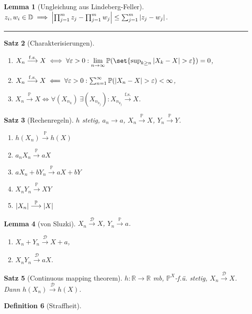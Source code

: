\documentclass[a4paper,8pt]{article}
\newcounter{Sec}
\theoremstyle{nonumberbreak}
\newtheorem{definition}{Definition}[Sec]
\newtheorem{satz}[definition]{Satz}
\newtheorem{lemma}[definition]{Lemma}
\newcommand{\sep}{%
	\rule{\linewidth}{0.15pt}%
	\stepcounter{Sec}%
	}
\renewcommand{\P}{\mathbb{P}}
\newcommand{\R}{\mathbb{R}}
\newcommand{\sk}{\mathrel{\stackrel{\P}{\longrightarrow}}}
\newcommand{\fsk}{\mathrel{\stackrel{\operatorname{f.s.}}{\longrightarrow}}}
\newcommand{\vk}{\mathrel{\stackrel{\mathcal{D}}{\longrightarrow}}}
\begin{document}
\begin{multicols}{3}
	\begin{lemma}[Ungleichung aus Lindeberg-Feller]
		$z_i, w_i \in \mathbb{D} \implies \abs{\prod_{j=1}^m z_j - \prod_{j=1}^m w_j} \leq \sum_{j=1}^m \abs{z_j - w_j}$.
	\end{lemma}
	\sep
	\begin{satz}[Charakterisierungen]
		\begin{enumerate}[label=(\alph*)]
			\item $X_n \fsk X \iff \forall\varepsilon>0:\lim\limits_{n\to\infty}\P(\set{\sup_{k\geq n}\abs{X_k-X}>\varepsilon}) = 0$,
			\item $X_n \fsk X \impliedby\forall \varepsilon>0:\sum_{n=1}^\infty\P(\abs{X_n-X}>\varepsilon)<\infty$,\\
			\item $X_n \sk X \iff \forall (X_{n_k})~\exists (X_{n_{k_j}}): X_{n_{k_j}}\fsk X$.
		\end{enumerate}
	\end{satz}
	\begin{satz}[Rechenregeln]
		$h$ stetig, $a_n\to a$, $X_n\sk X$, $Y_n\sk Y$.
		{\setlength{\columnseprule}{0pt}\begin{multicols}{2}
		\begin{enumerate}[label=(\alph*)]
			\item $h(X_n)\sk h(X)$
			\item $a_nX_n\sk aX$
			\item $aX_n+bY_n\sk aX+bY$
			\item $X_nY_n\sk XY$
			\item $\abs{X_n}\sk\abs{X}$
		\end{enumerate}
		\end{multicols}}
	\end{satz}
	\begin{lemma}[von Sluzki]
		$X_n\vk X$, $Y_n\sk a$.
		{\setlength{\columnseprule}{0pt}\begin{multicols}{2}
		\begin{enumerate}[label=(\alph*)]
			\item $X_n+Y_n\vk X+a$,
			\item $X_nY_n\vk aX$.
		\end{enumerate}
		\end{multicols}}
	\end{lemma}
	\begin{satz}[Continuous mapping theorem]
		$h\colon\R\to\R$ mb, $\P^X$-f.ü. stetig, $X_n\vk X$. Dann $h(X_n)\vk h(X)$.
	\end{satz}
	\begin{definition}[Straffheit]

\end{definition}
\end{multicols}
\end{document}
